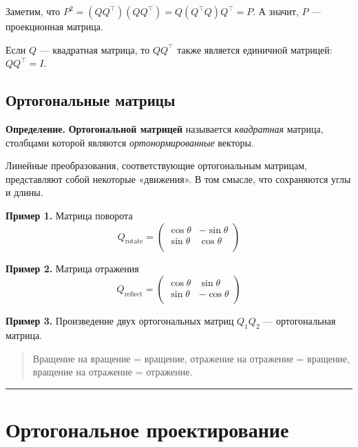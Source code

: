 \documentclass[11pt,a4paper]{article}
\begin{document}
Заметим, что $P^2 = (QQ^\top)(QQ^\top) = Q(Q^\top Q)Q^\top = P$.
А значит, $P$ --- проекционная матрица.

Если \(Q\) --- квадратная матрица, то \(Q Q^\top\) также является
единичной матрицей: \(Q Q^\top = I\).

    \hypertarget{ux43eux440ux442ux43eux433ux43eux43dux430ux43bux44cux43dux44bux435-ux432ux435ux43aux442ux43eux440ux44b-ux438-ux43cux430ux442ux440ux438ux446ux44b}{%
\subsection{Ортогональные
матрицы}\label{ux43eux440ux442ux43eux433ux43eux43dux430ux43bux44cux43dux44bux435-ux432ux435ux43aux442ux43eux440ux44b-ux438-ux43cux430ux442ux440ux438ux446ux44b}}

\textbf{Определение.} \textbf{Ортогональной матрицей} называется
\emph{квадратная} матрица, столбцами которой являются \emph{ортонормированные}
векторы.

Линейные преобразования, соответствующие ортогональным матрицам,
представляют собой некоторые «движения». В том смысле, что сохраняются
углы и длины.

\textbf{Пример 1.} Матрица поворота \[
  Q_\mathrm{rotate} =
  \begin{pmatrix}
     \cos\theta & -\sin\theta \\
     \sin\theta &  \cos\theta \\
  \end{pmatrix}
\]

\textbf{Пример 2.} Матрица отражения \[
  Q_\mathrm{reflect} =
  \begin{pmatrix}
     \cos\theta &  \sin\theta \\
     \sin\theta & -\cos\theta \\
  \end{pmatrix}
\]

\textbf{Пример 3.} Произведение двух ортогональных матриц \(Q_1 Q_2\)
--- ортогональная матрица.

\begin{quote}
Вращение на вращение = вращение, отражение на отражение = вращение,
вращение на отражение = отражение.
\end{quote}

    \begin{center}\rule{0.5\linewidth}{0.5pt}\end{center}

    \hypertarget{ux43eux440ux442ux43eux433ux43eux43dux430ux43bux44cux43dux43eux435-ux43fux440ux43eux435ux43aux442ux438ux440ux43eux432ux430ux43dux438ux435}{%
\section{Ортогональное
проектирование}\label{ux43eux440ux442ux43eux433ux43eux43dux430ux43bux44cux43dux43eux435-ux43fux440ux43eux435ux43aux442ux438ux440ux43eux432ux430ux43dux438ux435}}
\end{document}

